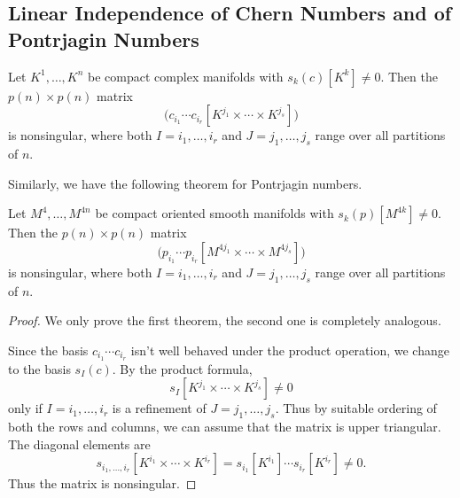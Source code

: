 \subsection{Linear Independence of Chern Numbers and of Pontrjagin Numbers}
\begin{theorem}[Thom]
    Let $K^{1},\dots,K^{n}$ be compact complex manifolds
    with $s_k(c)[K^{k}]\neq0$. Then the $p(n)\times p(n)$ matrix
    \begin{equation*}
        \Big(c_{i_1}\cdots c_{i_r}[K^{j_1}\times\cdots\times K^{j_s}]\Big)
    \end{equation*}
    is nonsingular, where both $I=i_1,\dots,i_r$ and
    $J=j_1,\dots,j_s$ range over all partitions of $n$. 
\end{theorem} 
Similarly, we have the following theorem for Pontrjagin numbers.
\begin{theorem}[Thom]
    Let $M^{4},\dots,M^{4n}$ be compact oriented smooth manifolds
    with $s_k(p)[M^{4k}]\neq0$. Then the $p(n)\times p(n)$ matrix
    \begin{equation*}
        \Big(p_{i_1}\cdots p_{i_r}[M^{4j_1}\times\cdots\times M^{4j_s}]\Big)
    \end{equation*}
    is nonsingular, where both $I=i_1,\dots,i_r$ and
    $J=j_1,\dots,j_s$ range over all partitions of $n$.
\end{theorem}
\begin{proof}
    We only prove the first theorem, 
    the second one is completely analogous.

    Since the basis $c_{i_1}\cdots c_{i_r}$ isn't well behaved
    under the product operation, we change to the basis $s_I(c)$.
    By the product formula, 
    \begin{equation*}
        s_I[K^{j_1}\times\cdots\times K^{j_s}] \neq 0
    \end{equation*}
    only if $I=i_1,\dots,i_r$ is a refinement of $J=j_1,\dots,j_s$.
    Thus by suitable ordering of both the rows and columns, we can assume that
    the matrix is upper triangular. The diagonal elements are
    \begin{equation*}
        s_{i_1,\dots,i_r}[K^{i_1}\times\cdots\times K^{i_r}] =
        s_{i_1}[K^{i_1}]\cdots s_{i_r}[K^{i_r}] \neq 0.
    \end{equation*}
    Thus the matrix is nonsingular.
\end{proof}